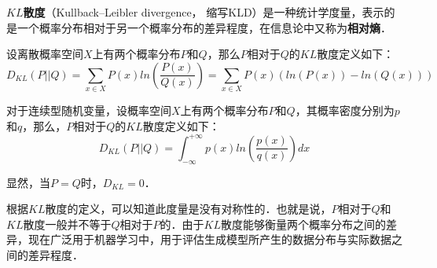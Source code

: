 

\textbf{$KL$散度}（Kullback–Leibler divergence， 缩写KLD）是一种统计学度量，表示的是一个概率分布相对于另一个概率分布的差异程度，在信息论中又称为\textbf{相对熵}．

设离散概率空间$X$上有两个概率分布$P$和$Q$，那么$P$相对于$Q$的$KL$散度定义如下：
\begin{equation}
D_{KL}(P||Q)=\sum_{x\in X}P(x)ln(\frac{P(x)}{Q(x)})=\sum_{x\in X}P(x)(ln(P(x))-ln(Q(x)))
\end{equation}

对于连续型随机变量，设概率空间$X$上有两个概率分布$P$和$Q$，其概率密度分别为$p$和$q$，那么，$P$相对于$Q$的$KL$散度定义如下：
\begin{equation}
D_{KL}(P||Q)=\int_{-\infty}^{+\infty}p(x)ln(\frac{p(x)}{q(x)})dx
\end{equation}

显然，当$P=Q$时，$D_{KL}=0$．

根据$KL$散度的定义，可以知道此度量是没有对称性的．也就是说，$P$相对于$Q$和$KL$散度一般并不等于$Q$相对于$P$的．由于$KL$散度能够衡量两个概率分布之间的差异，现在广泛用于机器学习中，用于评估生成模型所产生的数据分布与实际数据之间的差异程度．